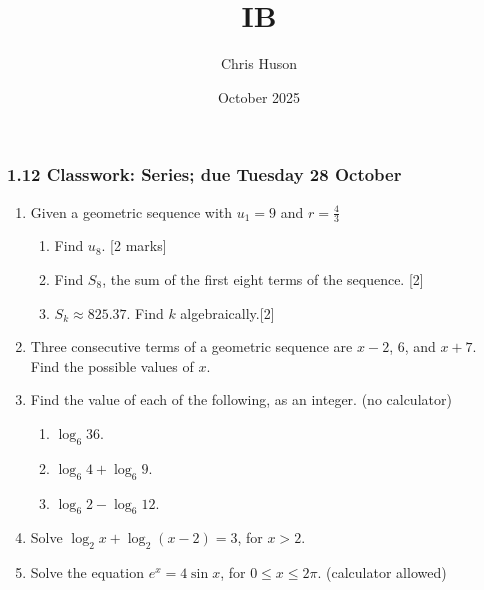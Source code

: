 \documentclass[12pt, twoside]{article}
\title{IB}
\author{Chris Huson}
\date{October 2025}
\begin{document}
\subsubsection*{1.12 Classwork: Series; due Tuesday 28 October}
\begin{enumerate}[itemsep=0.25cm]

\item Given a geometric sequence with $u_1=9$ and $r=\frac{4}{3}$
  \begin{enumerate}[itemsep=1cm]
      \item Find $u_8$. \hfill [2 marks]
      \item Find $S_8$, the sum of the first eight terms of the sequence. \hfill [2]
      \item $S_k\approx 825.37$. Find $k$ algebraically.\hfill [2]
  \end{enumerate} \vspace{2cm}

\item Three consecutive terms of a geometric sequence are $x-2$, 6, and $x+7$.\\
Find the possible values of $x$.
    \begin{flushright}[6]\end{flushright} \vspace{2cm}


\item Find the value of each of the following, as an integer. (no calculator)
\begin{enumerate}
    \item $\log_6 36$.
        \begin{flushright}[2]\end{flushright}
    \item $\log_6 4 + \log_6 9$.
        \begin{flushright}[2]\end{flushright}
    \item $\log_6 2 - \log_6 12$.
        \begin{flushright}[3]\end{flushright}
\end{enumerate}

\item Solve $\log_2 x + \log_2 (x-2) = 3$, for $x>2$.
    \begin{flushright}[7]\end{flushright} \vspace{1cm}

\newpage
\item Solve the equation $e^x = 4 \sin x$, for $0 \leq x \leq 2 \pi$. (calculator allowed)
    \begin{flushright}[5]\end{flushright} \vspace{1cm}


\end{enumerate}
\end{document}
